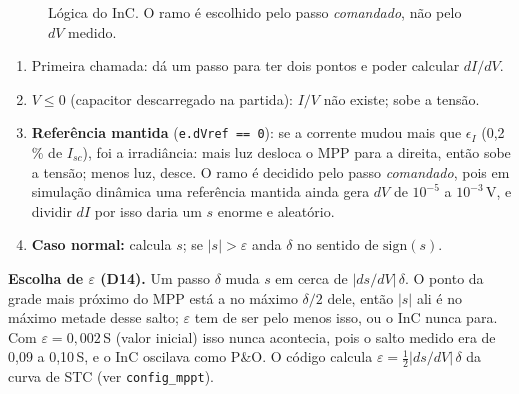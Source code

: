 \begin{figure}[htbp]
\centering
{}
\caption{L\'ogica do InC. O ramo \'e escolhido pelo passo \emph{comandado}, n\~ao pelo $dV$ medido.}
\label{fig:inc}
\end{figure}


\begin{logica}
\begin{enumerate}
\item Primeira chamada: d\'a um passo para ter dois pontos e poder calcular $dI/dV$.
\item $V\le0$ (capacitor descarregado na partida): $I/V$ n\~ao existe; sobe a tens\~ao.
\item \textbf{Refer\^encia mantida} (\texttt{e.dVref == 0}): se a corrente mudou mais que $\epsilon_I$ (0,2\,\% de $I_{sc}$), foi a irradi\^ancia: mais luz desloca o MPP para
 a direita, ent\~ao sobe a tens\~ao; menos luz, desce. O ramo \'e decidido pelo passo \emph{comandado}, pois em simula\c{c}\~ao din\^amica uma refer\^encia mantida ainda gera $dV$ de $10^{-5}$ a $10^{-3}$\,V, e dividir $dI$ por isso daria um $s$ enorme e aleat\'orio.
\item \textbf{Caso normal:} calcula $s$; se $|s|>\varepsilon$ anda $\delta$ no sentido de $\mathrm{sign}(s)$.
\end{enumerate}
\end{logica}

\textbf{Escolha de $\varepsilon$ (D14).} Um passo $\delta$ muda $s$ em cerca de $|ds/dV|\,\delta$. O ponto da grade mais pr\'oximo do MPP est\'a a no m\'aximo
$\delta/2$ dele, ent\~ao $|s|$ ali \'e no m\'aximo metade desse salto; $\varepsilon$ tem de ser pelo menos isso, ou o InC nunca para. Com
$\varepsilon=0{,}002$\,S (valor inicial) isso nunca acontecia, pois o salto medido era de 0,09 a 0,10\,S, e o InC oscilava como P\&O. O c\'odigo
calcula $\varepsilon=\tfrac12|ds/dV|\,\delta$ da curva de STC (ver \texttt{config\_mppt}).

